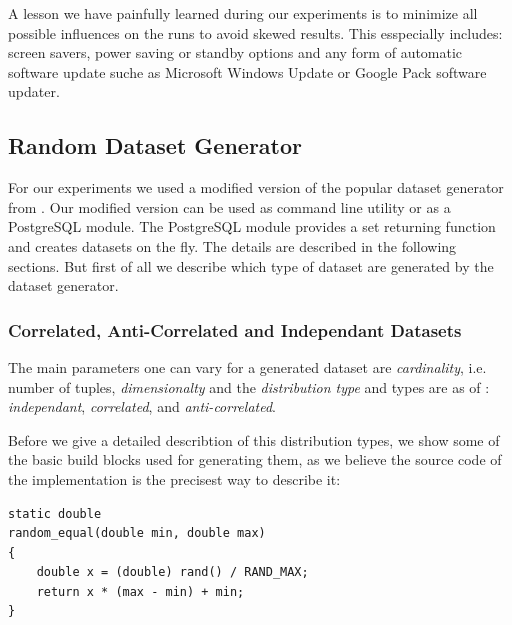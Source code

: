 A lesson we have painfully learned during our experiments is to
minimize all possible influences on the runs to avoid skewed
results. This esspecially includes: screen savers, power saving or
standby options and any form of automatic software update suche as
Microsoft Windows Update or Google Pack software updater.



\subsection{Random Dataset Generator}

For our experiments we used a modified version \citep{Eder2007a} of
the popular dataset generator from \citep{Borzsonyi2001}.  Our
modified version can be used as command line utility or as a
PostgreSQL module. The PostgreSQL module provides a set returning
function and creates datasets on the fly.  The details are described
in the following sections.  But first of all we describe which type of
dataset are generated by the dataset generator.

\subsubsection{Correlated, Anti-Correlated and Independant Datasets}
\label{sec:corr-anti-indep}

The main parameters one can vary for a generated dataset are
\emph{cardinality}, i.e. number of tuples, \emph{dimensionalty} and
the \emph{distribution type} and types are as of \citep{Borzsonyi2001}: 
\emph{independant}, \emph{correlated}, and \emph{anti-correlated}.


Before we give a detailed describtion of this distribution types, we
show some of the basic build blocks used for generating them, as we
believe the source code of the implementation is the precisest way to
describe it:

\begin{lstlisting}
static double
random_equal(double min, double max)
{
	double x = (double) rand() / RAND_MAX;
	return x * (max - min) + min;
}
\end{lstlisting}

